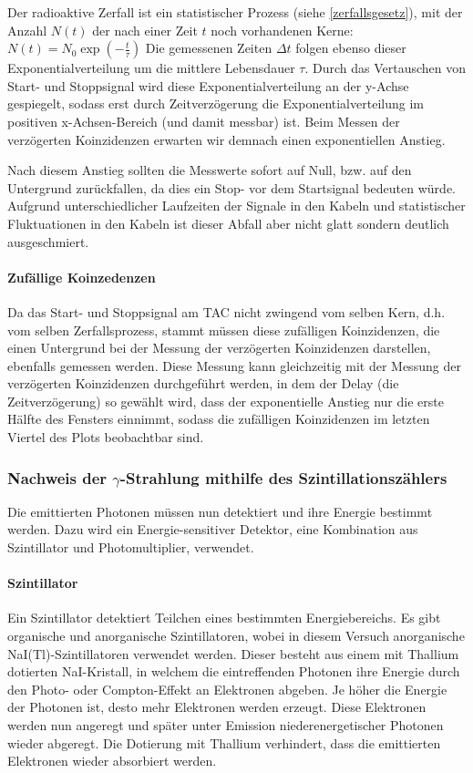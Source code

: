 \documentclass[12pt]{article}
\begin{document}
 Der radioaktive Zerfall ist ein statistischer Prozess (siehe \ref{zerfallsgesetz}), mit der Anzahl $N(t)$ der nach einer Zeit $t$ noch vorhandenen Kerne: $N(t)=N_0\exp({-\frac t \tau})$ Die gemessenen Zeiten $\Delta t$ folgen ebenso dieser Exponentialverteilung um die mittlere Lebensdauer $\tau$.
 Durch das Vertauschen von Start- und Stoppsignal wird diese Exponentialverteilung an der y-Achse gespiegelt, sodass erst durch Zeitverzögerung die Exponentialverteilung im positiven x-Achsen-Bereich  (und damit messbar) ist. Beim Messen der verzögerten Koinzidenzen erwarten wir demnach einen exponentiellen Anstieg.
 
 Nach diesem Anstieg sollten die Messwerte sofort auf Null, bzw. auf den Untergrund zurückfallen, da dies ein Stop- vor dem Startsignal bedeuten würde. Aufgrund unterschiedlicher Laufzeiten der Signale in den Kabeln und statistischer Fluktuationen in den Kabeln ist dieser Abfall aber nicht glatt sondern deutlich ausgeschmiert.
 
 \paragraph{Zufällige Koinzedenzen} Da das Start- und Stoppsignal am TAC nicht zwingend vom selben Kern, d.h. vom selben Zerfallsprozess, stammt müssen diese zufälligen Koinzidenzen, die einen Untergrund bei der Messung der verzögerten Koinzidenzen darstellen, ebenfalls gemessen werden. Diese Messung kann gleichzeitig mit der Messung der verzögerten Koinzidenzen durchgeführt werden, in dem der Delay (die Zeitverzögerung) so gewählt wird, dass der exponentielle Anstieg nur die erste Hälfte des Fensters einnimmt, sodass die zufälligen Koinzidenzen im letzten Viertel des Plots beobachtbar sind. 
 
 \subsubsection{Nachweis der $\gamma$-Strahlung mithilfe des Szintillationszählers}
 Die emittierten Photonen müssen nun detektiert und ihre Energie bestimmt werden. Dazu wird ein Energie-sensitiver Detektor, eine Kombination aus Szintillator und Photomultiplier, verwendet.
 \paragraph{Szintillator} Ein Szintillator detektiert Teilchen eines bestimmten Energiebereichs. Es gibt organische und anorganische Szintillatoren, wobei in diesem Versuch anorganische NaI(Tl)-Szintillatoren verwendet werden. Dieser besteht aus einem mit Thallium dotierten NaI-Kristall, in welchem die eintreffenden Photonen ihre Energie durch den Photo- oder Compton-Effekt an Elektronen abgeben. Je höher die Energie der Photonen ist, desto mehr Elektronen werden erzeugt. Diese Elektronen werden nun angeregt und später unter Emission  niederenergetischer Photonen wieder abgeregt. Die Dotierung mit Thallium verhindert, dass die emittierten Elektronen wieder absorbiert werden.
\end{document}
